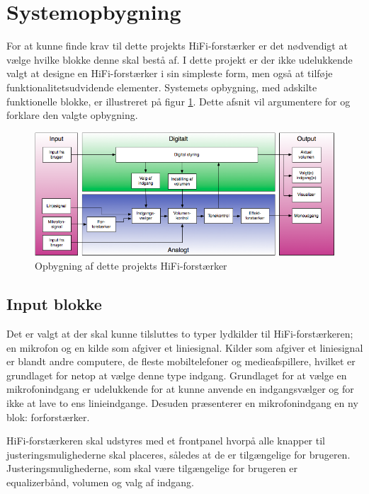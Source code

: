 \section{Systemopbygning}
For at kunne finde krav til dette projekts HiFi-forstærker er det nødvendigt at vælge hvilke blokke denne skal bestå af. I dette projekt er der ikke udelukkende valgt at designe en HiFi-forstærker i sin simpleste form, men også at tilføje funktionalitetsudvidende elementer. Systemets opbygning, med adskilte funktionelle blokke, er illustreret på figur \ref{fig:hififorstaerker_opbygning}. Dette afsnit vil argumentere for og forklare den valgte opbygning. 


\begin{figure}[h]
\centering
\includegraphics[scale=0.6]{indledende_analyse/systemopbygning/forstaerker_opbygning.png}
\caption{Opbygning af dette projekts HiFi-forstærker}
\label{fig:hififorstaerker_opbygning}
\end{figure}


\subsection*{Input blokke}
Det er valgt at der skal kunne tilsluttes to typer lydkilder til HiFi-forstærkeren; en mikrofon og en kilde som afgiver et liniesignal. Kilder som afgiver et liniesignal er blandt andre computere, de fleste mobiltelefoner og medieafspillere, hvilket er grundlaget for netop at vælge denne type indgang. 
Grundlaget for at vælge en mikrofonindgang er udelukkende for at kunne anvende en indgangsvælger og for ikke at lave to ens linieindgange. Desuden præsenterer en mikrofonindgang en ny blok: forforstærker.

HiFi-forstærkeren skal udstyres med et frontpanel hvorpå alle knapper til justeringsmulighederne skal placeres, således at de er tilgængelige for brugeren. Justeringsmulighederne, som skal være tilgængelige for brugeren er equalizerbånd, volumen og valg af indgang.


